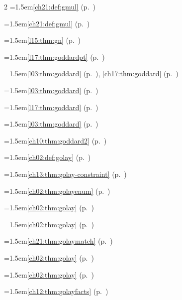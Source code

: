 \begin{multicols}{2}
\hangindent=1.5em\quad \ref{ch21:def:gmul} (p.~\pageref{ch21:def:gmul})\par
\hangindent=1.5em\quad \ref{ch21:def:gmul} (p.~\pageref{ch21:def:gmul})\par
\hangindent=1.5em\quad \ref{l15:thm:gn} (p.~\pageref{l15:thm:gn})\par
\hangindent=1.5em\quad \ref{l17:thm:goddardpt} (p.~\pageref{l17:thm:goddardpt})\par
\hangindent=1.5em\quad \ref{l03:thm:goddard} (p.~\pageref{l03:thm:goddard}), \ref{ch17:thm:goddard} (p.~\pageref{ch17:thm:goddard})\par
\hangindent=1.5em\quad \ref{l03:thm:goddard} (p.~\pageref{l03:thm:goddard})\par
\hangindent=1.5em\quad \ref{l17:thm:goddard} (p.~\pageref{l17:thm:goddard})\par
\hangindent=1.5em\quad \ref{l03:thm:goddard} (p.~\pageref{l03:thm:goddard})\par
\hangindent=1.5em\quad \ref{ch10:thm:goddard2} (p.~\pageref{ch10:thm:goddard2})\par
\hangindent=1.5em\quad \ref{ch02:def:golay} (p.~\pageref{ch02:def:golay})\par
\hangindent=1.5em\quad \ref{ch13:thm:golay-constraint} (p.~\pageref{ch13:thm:golay-constraint})\par
\hangindent=1.5em\quad \ref{ch02:thm:golayenum} (p.~\pageref{ch02:thm:golayenum})\par
\hangindent=1.5em\quad \ref{ch02:thm:golay} (p.~\pageref{ch02:thm:golay})\par
\hangindent=1.5em\quad \ref{ch02:thm:golay} (p.~\pageref{ch02:thm:golay})\par
\hangindent=1.5em\quad \ref{ch21:thm:golaymatch} (p.~\pageref{ch21:thm:golaymatch})\par
\hangindent=1.5em\quad \ref{ch02:thm:golay} (p.~\pageref{ch02:thm:golay})\par
\hangindent=1.5em\quad \ref{ch02:thm:golay} (p.~\pageref{ch02:thm:golay})\par
\hangindent=1.5em\quad \ref{ch12:thm:golayfacts} (p.~\pageref{ch12:thm:golayfacts})\par

\end{multicols}
